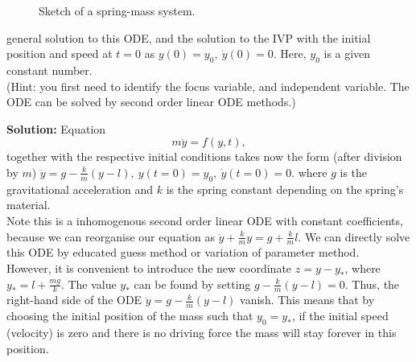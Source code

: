 \documentclass[11pt,a4paper,twoside]{article}
\begin{document}
	\begin{figure}[H]
		\centering
		\caption{Sketch of a spring-mass system.}\label{f1}
	\end{figure}
	general solution to this ODE, and the solution to the IVP with the initial position and speed at $t = 0$ as $y(0) = y_0,\ \dot{y}(0) = 0$. Here, $y_0$ is a given constant number.\\
	(Hint: you first need to identify the focus variable, and independent variable. The ODE can be solved by second order linear ODE methods.)\par
	\textbf{Solution:} Equation
	$$
	m\ddot{y} = f(y, t),
	$$
	together with the respective initial conditions takes now the form (after division by $m$) $\ddot{y} = g - \frac{k}{m}(y-l),\ y(t = 0) = y_0,\ \dot{y}(t=0) = 0$. where $g$ is the gravitational acceleration and $k$ is the spring constant depending on the spring’s material.\\
	Note this is a inhomogenous second order linear ODE with constant coefficients, because we can reorganise our equation as $\ddot{y} + \frac{k}{m}y = g+\frac{k}{m}l$. We can directly solve this ODE by educated guess method or variation of parameter method.\\
	However, it is convenient to introduce the new coordinate $z = y−y_*$, where $y_* = l + \frac{mg}{k}$. The value $y_*$ can be found by setting $g - \frac{k}{m}(y-l) = 0$. Thus, the right-hand side of the ODE $\ddot{y} = g - \frac{k}{m}(y-l)$ vanish. This means that by choosing the initial position of the mass such that $y_0 = y_*$, if the initial speed (velocity) is zero and there is no driving force the mass will stay forever in this position.\par
\end{document}
